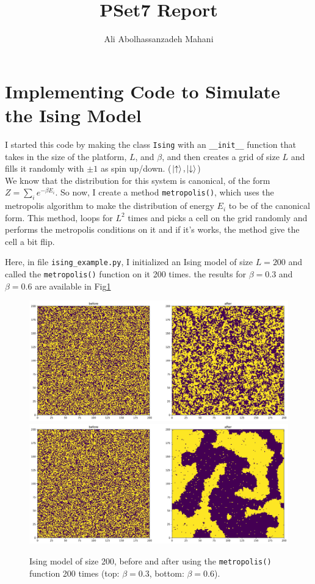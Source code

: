 \documentclass[12pt, a4paper]{article}
\title{PSet7 Report}
\author{Ali Abolhassanzadeh Mahani}
\begin{document}
	\maketitle
	\section{Implementing Code to Simulate the Ising Model}
	I started this code by making the class \texttt{Ising} with an \texttt{\_\_init\_\_} function that 
	takes in the size of the platform, $L$, and $\beta$, and then creates a grid of size $L$ and fills it
	randomly with $\pm1$ as spin up/down. ($\ket{\uparrow}, \ket{\downarrow}$)\\
	
	We know that the distribution for this system is canonical, of the form
	$Z = \sum_{i}^{} e^{-\beta E_i}$. So now, I create a method \texttt{metropolis()}, which uses the metropolis algorithm to make the distribution of energy $E_i$ to be of the canonical form.
	This method, loops for $L^2$ times and picks a cell on the grid randomly and performs the metropolis conditions on it and if it's works, the method give the cell a bit flip.
	
	Here, in file \texttt{ising\_example.py}, I initialized an Ising model of size $L = 200$ and called the \texttt{metropolis()} 
	function on it 200 times. the results for $\beta = 0.3$ and $\beta = 0.6$ are available in Fig\ref{fig:ising_grid}
	\begin{figure}[h!]
		\centering
		\includegraphics[width=0.9\linewidth]{../ba3.jpg}
		\includegraphics[width=0.9\linewidth]{../ba6.jpg}
		\label{fig:ising_grid}
		\caption{Ising model of size 200, before and after using the \texttt{metropolis()} function 200 times (top: $\beta = 0.3$, bottom: $\beta = 0.6$).}
	\end{figure}
	
\end{document}
